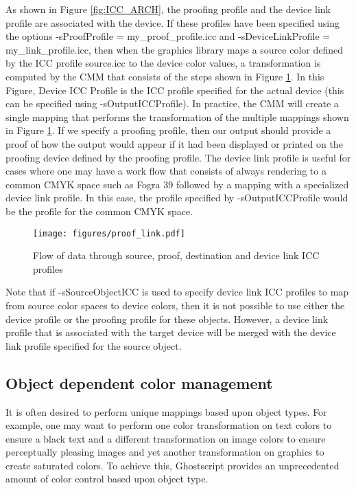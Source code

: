 \documentclass[12pt,notitlepage]{article}
\begin{document}
As shown in Figure \ref{fig:ICC_ARCH}, the proofing profile and the device link profile are associated with the device.  If these profiles have been specified using the options
-sProofProfile = my\_proof\_profile.icc and -sDeviceLinkProfile = my\_link\_profile.icc, then when the graphics library maps a source color defined by the ICC profile source.icc to the device color values, a transformation is computed by the CMM that consists of the steps shown in Figure \ref{fig:proof_link}. In this Figure, Device ICC Profile is the ICC profile specified for the actual device (this can be specified using -sOutputICCProfile).  In practice, the CMM will create a single mapping that performs the transformation of the multiple mappings shown in Figure \ref{fig:proof_link}.  If we specify a proofing profile, then our output should provide a proof of how the output would appear if it had been displayed or printed on the proofing device defined by the proofing profile.  The device link profile is useful for cases where one may have a work flow that consists of always rendering to a common CMYK space such as Fogra 39 followed by a mapping with a specialized device link profile.  In this case, the profile specified by -sOutputICCProfile would be the profile for the common CMYK space.

\begin{figure}
    \begin{center}
\texttt{[image: figures/proof\_link.pdf]}
    \end{center}
   \caption{Flow of data through source, proof, destination and device link ICC profiles}
   \label{fig:proof_link}
\end{figure}

Note that if -sSourceObjectICC is used to specify device link ICC profiles to map from source color spaces to device colors, then it is not possible to use either the device profile or the proofing profile for these objects.  However, a device link profile that is associated with the target device will be merged with the device link profile specified for the source object.

\subsection{Object dependent color management}

It is often desired to perform unique mappings based upon object types.  For example, one may want to perform one color transformation on text colors to ensure a black text and a different transformation on image colors to ensure perceptually pleasing images and yet another transformation on graphics to create saturated colors.   To achieve this, Ghostscript provides an unprecedented amount of color control based upon object type.
\end{document}
